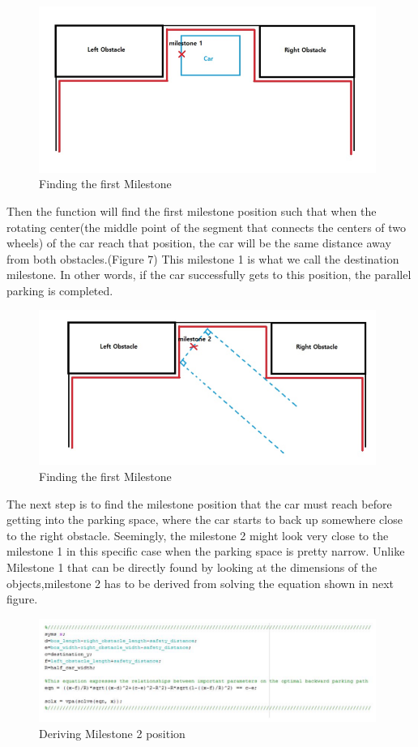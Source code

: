 \documentclass[12pt, letterpaper]{amsart} %
\numberwithin{equation}{section}
\begin{document}
\begin{figure}[h!]
\includegraphics[width=110mm]{./img/fig_7.png}
\caption{Finding the first Milestone}
\label{fig:figure7}	
\end{figure}

Then the function will find the first milestone position such that when the rotating center(the middle point of the segment that connects the centers of two wheels) of the car reach that position, the car will be the same distance away from both obstacles.(Figure 7)
This milestone 1 is what we call the destination milestone. In other words, if the car successfully gets to this position, the parallel parking is completed.

\begin{figure}[h!]
\includegraphics[width=110mm]{./img/fig_8.png}
\caption{Finding the first Milestone}
\label{fig:figure8}	
\end{figure}

The next step is to find the milestone position that the car must reach before getting into the parking space, where the car starts to back up somewhere close to the right obstacle.
Seemingly, the milestone 2 might look very close to the milestone 1 in this specific case when the parking space is pretty narrow. 
Unlike Milestone 1 that can be directly found by looking at the dimensions of the objects,milestone 2 has to be derived from solving the equation shown in next figure.
\newpage
\begin{figure}[h!]
\includegraphics[width=110mm]{./img/fig_9.png}
\caption{Deriving Milestone 2 position}
\label{fig:figure9}	
\end{figure}
\end{document}
